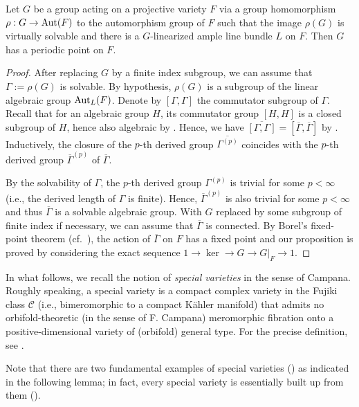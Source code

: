 \begin{prop}\label{prop-sol-fixed}
	Let $G$ be a group acting on a projective variety $F$ via a group homomorphism $\rho: G\to \textup{Aut}(F)$ to the automorphism group of $F$ such that the image $\rho(G)$ is virtually solvable and there is a $G$-linearized ample line bundle $L$ on $F$.
	Then $G$ has a periodic point on $F$.	
\end{prop}
\begin{proof}
	After replacing  $G$ by a finite index subgroup, we can assume that $\Gamma:=\rho(G)$ is solvable. By hypothesis, $\rho(G)$ is a subgroup of the linear algebraic group $\textup{Aut}_L(F)$.
	Denote by $[\Gamma,\Gamma]$ the commutator subgroup of $\Gamma$.  
	Recall that for an algebraic group $H$, its commutator group $[H,H]$ is a closed subgroup of $H$, hence also algebraic by \cite[Chapter I, \S 2.3 Proposition, pp.~58-59]{Bor69}.
	Hence,  %
	we have $\overline{[\Gamma,\Gamma]}=[\overline{\Gamma},\overline{\Gamma}]$ by \cite[Chapter I, \S2.1(e), p.~57]{Bor69}.	
	Inductively, the closure of the $p$-th derived group  $\overline{\Gamma^{(p)}}$ coincides with the $p$-th derived group $\overline{\Gamma}^{(p)}$ of $\overline{\Gamma}$.
	
	By the solvability of $\Gamma$,  the $p$-th derived group $\Gamma^{(p)}$ is trivial for some $p<\infty$ (i.e., the derived length of $\Gamma$ is finite).
	Hence, $\overline{\Gamma}^{(p)}$ is also trivial for some $p<\infty$ and thus $\overline{\Gamma}$ is a solvable algebraic group.
	With 
	$G$ replaced by some subgroup of finite index if necessary, we can  assume that $\overline{\Gamma}$ is connected.
	By Borel's fixed-point theorem (cf.~\cite[Theorem 10.4, p.~137]{Bor69}), the action of $\overline{\Gamma}$ on $F$ has a fixed point and our proposition is proved by considering the exact sequence $1\to\ker\to G\to G|_F\to 1$.
\end{proof}


In what follows, we recall the notion of {\it special varieties} in the sense of Campana. 
Roughly speaking, a special variety is a compact complex variety in the Fujiki class $\mathcal{C}$ (i.e., bimeromorphic to a compact K\"ahler manifold) that admits no orbifold-theoretic (in the sense of F. Campana) meromorphic fibration onto a positive-dimensional variety of (orbifold) general type. For the precise definition, see \cite[Definition 2.1(2)]{Cam04}. 

Note that there are two fundamental examples of special varieties (\cite[Theorem 3.22, Theorem 5.1]{Cam04}) as indicated in the following lemma; in fact, every special variety is essentially built up from them (\cite[Example 2.3, \S 6.5]{Cam04}).

